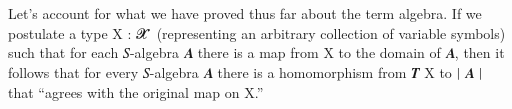 \begin{code}
\>[2]\<%
\\
%
\>[2]\AgdaSpace{}%
\AgdaSymbol{:}\AgdaSpace{}%
\AgdaSymbol{(}\AgdaSpace{}%
\AgdaSpace{}%
\AgdaSymbol{)}\AgdaSpace{}%
\AgdaSymbol{(}\AgdaSpace{}%
\AgdaSpace{}%
\AgdaSpace{}%
\AgdaSpace{}%
\AgdaSymbol{)}\AgdaSpace{}%
\AgdaSpace{}%
\AgdaSymbol{(}\AgdaSpace{}%
\AgdaSpace{}%
\AgdaSymbol{)}\AgdaSpace{}%
\AgdaSymbol{(}\AgdaSpace{}%
\AgdaSpace{}%
\AgdaSpace{}%
\AgdaSpace{}%
\AgdaSymbol{)}\<%
\\
%
\>[2]\AgdaSpace{}%
\AgdaSymbol{=}\AgdaSpace{}%
\AgdaSpace{}%
\AgdaSymbol{(}\AgdaSpace{}%
\AgdaSpace{}%
\AgdaSymbol{)}\AgdaSpace{}%
\AgdaSymbol{(}\AgdaSpace{}%
\AgdaSpace{}%
\AgdaSpace{}%
\AgdaSpace{}%
\AgdaSpace{}%
\AgdaSpace{}%
\AgdaSpace{}%
\AgdaSpace{}%
\AgdaSpace{}%
\AgdaSpace{}%
\AgdaSymbol{(}\AgdaSpace{}%
\AgdaSymbol{))}\<%
\end{code}
\ccpad
Let's account for what we have proved thus far about the term algebra.  If we
postulate a type \ab X \as : \ab 𝓧 \af ̇ (representing an arbitrary collection of
variable symbols) such that for each \ab 𝑆-algebra \ab 𝑨 there is a map from \ab
X to the domain of \ab 𝑨, then it follows that for every \ab 𝑆-algebra \ab 𝑨
there is a homomorphism from \af 𝑻 \ab X to \af ∣ \ab 𝑨 \af ∣ that ``agrees with
the original map on \ab X.''

